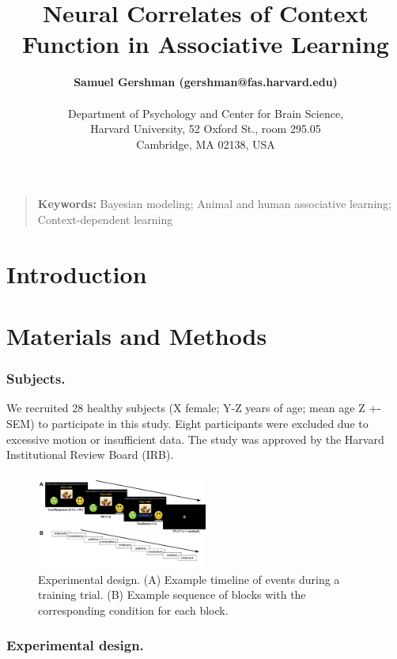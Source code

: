 \documentclass[10pt,letterpaper]{article}
\title{Neural Correlates of Context Function in Associative Learning}
\author{{\large \bf Samuel Gershman (gershman@fas.harvard.edu)} 
  \AND {\large \bf Momchil Tomov (mtomov@g.harvard.edu)} 
  \AND {\large \bf Hayley Dorfman (hdorfman@g.harvard.edu)} \\ \\
  Department of Psychology and Center for Brain Science,\\
  Harvard University, 52 Oxford St., room 295.05\\
Cambridge, MA 02138, USA}
\begin{document}
\maketitle


\begin{quote}
\small
\textbf{Keywords:} 
Bayesian modeling; Animal and human associative learning; Context-dependent learning
\end{quote}

\section{Introduction}



\section{Materials and Methods}

\subsubsection{Subjects.}

We recruited 28 healthy subjects (X female; Y-Z years of age; mean age Z +- SEM) to participate in this study. Eight participants were excluded due to excessive motion or insufficient data. The study was approved by the Harvard Institutional Review Board (IRB).

\begin{figure}[ht]
\begin{center}
\includegraphics[width=0.5\textwidth]{task-design.pdf}
\end{center}
\vspace{-1em}
\caption{Experimental design. (A) Example timeline of events during a training trial. (B) Example sequence of blocks with the corresponding condition for each block. } 
\label{task-design}
\end{figure}

\subsubsection{Experimental design.} 
\end{document}
